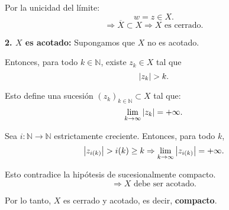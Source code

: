 {	Por la unicidad del límite:
	\[
	w = z \in X.
	\]
	\[
	\Rightarrow \overline{X} \subset X \Rightarrow X \text{ es cerrado}.
	\]
	
	\textbf{2. \(X\) es acotado:}  
	Supongamos que \(X\) no es acotado.
	
	Entonces, para todo \(k \in \mathbb{N}\), existe \( z_k \in X \) tal que
	\[
	\abs{z_k} > k.
	\]
	
	Esto define una sucesión \( (z_k)_{k \in \mathbb{N}} \subset X \) tal que:
	\[
	\lim_{k \to \infty} \abs{z_k} = +\infty.
	\]
	
	Sea \( i \colon \mathbb{N} \to \mathbb{N} \) estrictamente creciente.  
	Entonces, para todo \(k\),
	\[
	\abs{z_{i(k)}} > i(k) \geq k \Rightarrow \lim_{k \to \infty} \abs{z_{i(k)}} = +\infty.
	\]
	
	
	Esto contradice la hipótesis de sucesionalmente compacto.  
	\[
	\Rightarrow X \text{ debe ser acotado}.
	\]
	
	Por lo tanto, \(X\) es cerrado y acotado, es decir, \textbf{compacto}.
}
 
 
